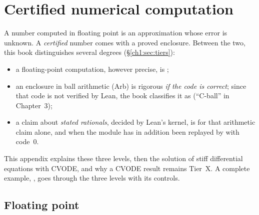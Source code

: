 \ifdefined\chemin\else
{}
\DeclareUrlCommand{}
\DeclareUrlCommand{}
\fi
\chapter{Certified numerical computation}\label{appD:chap}

A number computed in floating point is an approximation whose error is unknown. A \emph{certified} number comes with a
proved enclosure. Between the two, this book distinguishes several degrees (§\ref{ch1:sec:tiers}):
\begin{itemize}
\item a floating-point computation, however precise, is \tierX{};
\item an enclosure in ball arithmetic (Arb) is rigorous \emph{if the code is correct}; since that code is not verified
by Lean, the book classifies it as \tierC{} (``C-ball'' in Chapter~3);
\item a claim about \emph{stated rationals}, decided by Lean's kernel, is \tierAs{} for that arithmetic claim alone, and
\tierA{} when the module has in addition been replayed by  with code~$0$.
\end{itemize}
This appendix explains these three levels, then the solution of stiff differential equations with CVODE, and why a
CVODE result remains Tier~X. A complete example, , goes through the three levels with
its controls.

\section{Floating point}\label{appD:sec:flottant}

